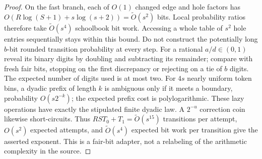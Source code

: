 \begin{proof}
On the fast branch, each of $O(1)$ changed edge and hole factors has
$O(R\log(S+1)+s\log(s+2))=\widetilde O(s^2)$ bits. Local probability
ratios therefore take $\widetilde O(s^4)$ schoolbook bit work.
Accessing a whole table of $s^2$ hole entries sequentially stays within
this bound. Do not construct the potentially long $b$-bit rounded
transition probability at every step. For a rational $a/d\in(0,1)$
reveal its binary digits by doubling and subtracting its remainder;
compare with fresh fair bits, stopping on the first discrepancy or rejecting
on a tie of $b$ digits. The expected number of digits used is at most two.
For $4s$ nearly uniform token bins, a dyadic prefix of length $k$ is
ambiguous only if it meets a boundary, probability $O(s2^{-k})$; the
expected prefix cost is polylogarithmic. These lazy operations have exactly
the stipulated finite dyadic law. A $2^{-u}$ correction coin likewise
short-circuits.  Thus $RST_0+T_1=\widetilde O(s^{15})$ transitions per
attempt, $O(s^2)$ expected attempts, and $\widetilde O(s^4)$ expected
bit work per transition give the asserted exponent. This is a fair-bit
adapter, not a relabeling of the arithmetic complexity in the source.
\end{proof}

